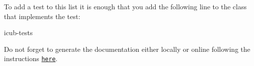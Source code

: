 To add a test to this list it is enough that you add the following line to the class that implements the test\-:

\begin{DoxyVerb}\ingroup icub-tests\end{DoxyVerb}


Do not forget to generate the documentation either locally or online following the instructions \href{https://github.com/robotology/icub-tests/}{\tt here}. 